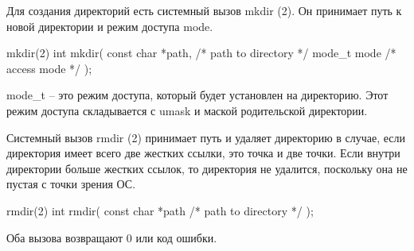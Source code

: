 Для создания директорий есть системный вызов mkdir (2). Он принимает путь к новой директории и режим доступа mode.

\begin{CCode}{mkdir(2)}
	int mkdir(
		const char *path,	/* path to directory */
		mode_t mode 		/* access mode */
	); \end{CCode}

mode\_t -- это режим доступа, который будет установлен на директорию. Этот режим доступа складывается с umask и маской родительской директории.

Системный вызов rmdir (2) принимает путь и удаляет директорию в случае, если директория имеет всего две жестких ссылки, это точка и две точки. Если внутри директории больше жестких ссылок, то директория не удалится, поскольку она не пустая с точки зрения ОС.

\begin{CCode}{rmdir(2)}
	int rmdir(
		const char *path /* path to directory */
	); \end{CCode}

Оба вызова возвращают 0 или код ошибки.